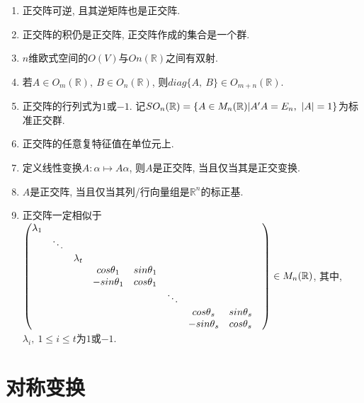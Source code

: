 \begin{property}
    \par
    \begin{enumerate}[itemindent=1em]
        \item 正交阵可逆, 且其逆矩阵也是正交阵.
        \item 正交阵的积仍是正交阵, 正交阵作成的集合是一个群.
        \item $n$维欧式空间的$O(V)$与$On(\mathbb{R})$之间有双射.
        \item 若$A\in O_m(\mathbb{R}),\ B\in O_n(\mathbb{R})$, 则$diag\{A,\ B\}\in O_{m+n}(\mathbb{R})$.
        \item 正交阵的行列式为$1$或$-1$. 记$SO_n(\mathbb{R})=\{A\in M_n(\mathbb{R})|A'A=E_n,\ \vert A\vert=1\}$为标准正交群.
        \item 正交阵的任意复特征值在单位元上.
        \item 定义线性变换$A: \alpha\mapsto A\alpha$, 则$A$是正交阵, 当且仅当其是正交变换.
        \item $A$是正交阵, 当且仅当其列/行向量组是$\mathbb{R}^n$的标正基.
        \item 正交阵一定相似于$\begin{pmatrix}
            \lambda{_1} &      &           &             &             & & & & \\
                        &\ddots&           &             &             & & & & \\
                        &      &\lambda{_t}&             &             & & & & \\
                        &      &           & cos\theta{_1}&sin\theta{_1}& & & & \\
                        &      &           &-sin\theta{_1}&cos\theta{_1}&      & & & \\
                        &      &           &              &             &\ddots& & & \\
                        &      &           &              &             &      &cos\theta{_s}&sin\theta{_s}& \\
                        &      &           &              &             &      &-sin\theta{_s}&cos\theta{_s}&
        \end{pmatrix}\in M_{n}(\mathbb{R})$, 其中, $\lambda{_i},\ 1\le i \le t$为$1$或$-1$.
    \end{enumerate}
\end{property}

\section{ 对称变换 }


